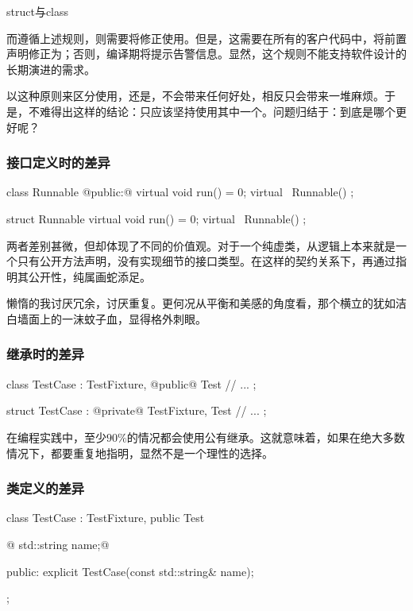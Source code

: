 \begin{content}
\begin{episode}{struct与class}
\begin{content}
而遵循上述规则，则需要将修正使用。但是，这需要在所有的客户代码中，将前置声明修正为；否则，编译期将提示告警信息。显然，这个规则不能支持软件设计的长期演进的需求。

以这种原则来区分使用，还是，不会带来任何好处，相反只会带来一堆麻烦。于是，不难得出这样的结论：只应该坚持使用其中一个。问题归结于：到底是哪个更好呢？

\subsubsection{接口定义时的差异}

\begin{c++}
class Runnable {
@public:@
  virtual void run() = 0;
  virtual ~Runnable() {}
};

struct Runnable {
  virtual void run() = 0;
  virtual ~Runnable() {}
};
\end{c++}

两者差别甚微，但却体现了不同的价值观。对于一个纯虚类，从逻辑上本来就是一个只有公开方法声明，没有实现细节的接口类型。在这样的契约关系下，再通过指明其公开性，纯属画蛇添足。

懒惰的我讨厌冗余，讨厌重复。更何况从平衡和美感的角度看，那个横立的犹如洁白墙面上的一沫蚊子血，显得格外刺眼。

\subsubsection{继承时的差异}

\begin{c++}
class TestCase : TestFixture, @public@ Test {
  // ...
};

struct TestCase : @private@ TestFixture, Test {
  // ...  
};
\end{c++}

在编程实践中，至少$90\%$的情况都会使用公有继承。这就意味着，如果在绝大多数情况下，都要重复地指明，显然不是一个理性的选择。

\subsubsection{类定义的差异}

\begin{c++}
class TestCase : TestFixture, public Test {
@  std::string name;@

public:
  explicit TestCase(const std::string& name);
};


\end{c++}
\end{content}
\end{episode}
\end{content}
